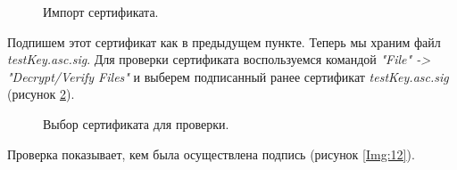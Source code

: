 \documentclass[10pt,a4paper]{report}
\begin{document}
		\begin{figure}[h]
			\caption{Импорт сертификата.}
			\label{Img:10}
		\end{figure}	
	
	Подпишем этот сертификат как в предыдущем пункте. Теперь мы храним файл \textit{testKey.asc.sig}. Для проверки сертификата воспользуемся командой \textit{"File" -> "Decrypt/Verify Files"} и выберем подписанный ранее сертификат \textit{testKey.asc.sig} (рисунок \ref{Img:11}).
	
		\begin{figure}[h]
			\caption{Выбор сертификата для проверки.}
			\label{Img:11}
		\end{figure}	
		\pagebreak
		
	Проверка показывает, кем была осуществлена подпись (рисунок \ref{Img:12}).
		
\end{document}
